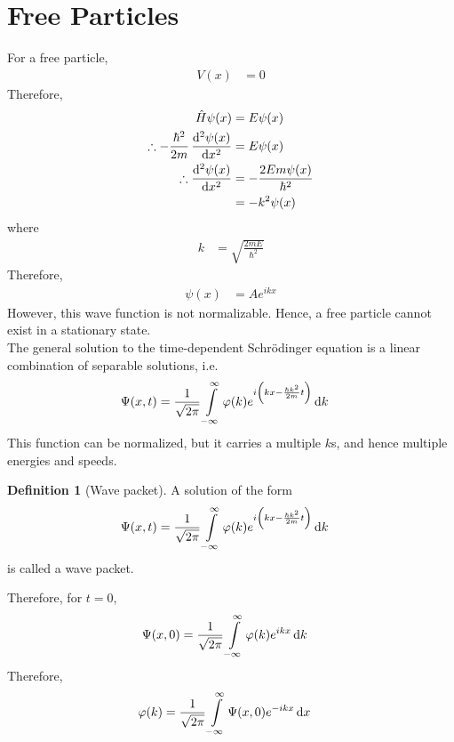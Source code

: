 \documentclass[titlepage, fleqn, a4paper, 12pt, twoside]{article}
\theoremstyle{definition}
\newtheorem{definition}{Definition}
\theoremstyle{theorem}
\let\Oldsection\section
\renewcommand{\section}{\FloatBarrier\Oldsection}
\begin{document}

\section{Free Particles}

For a free particle,
\begin{align*}
	V(x) &= 0
\end{align*}
Therefore,
\begin{align*}
	\hat{H} \psi(x) &= E \psi(x)\\
	\therefore -\frac{\hbar^2}{2 m} \dod[2]{\psi(x)}{x} &= E \psi(x)\\
	\therefore \dod[2]{\psi(x)}{x} &= -\frac{2 E m \psi(x)}{\hbar^2}\\
	&= -k^2 \psi(x)
\end{align*}
where
\begin{align*}
	k &= \sqrt{\frac{2 m E}{\hbar^2}}
\end{align*}
Therefore,
\begin{align*}
	\psi(x) &= A e^{i k x}
\end{align*}
However, this wave function is not normalizable.
Hence, a free particle cannot exist in a stationary state.\\

The general solution to the time-dependent Schrödinger equation is a linear combination of separable solutions, i.e.
\begin{align*}
	\Psi(x,t) &= \frac{1}{\sqrt{2 \pi}} \int\limits_{-\infty}^{\infty} \varphi(k) e^{i \left( k x - \frac{\hbar k^2}{2 m} t \right)} \dif k
\end{align*}
This function can be normalized, but it carries a multiple $k$s, and hence multiple energies and speeds.

\begin{definition}[Wave packet]
	A solution of the form
	\begin{align*}
		\Psi(x,t) &= \frac{1}{\sqrt{2 \pi}} \int\limits_{-\infty}^{\infty} \varphi(k) e^{i \left( k x - \frac{\hbar k^2}{2 m} t \right)} \dif k
	\end{align*}
	is called a wave packet.
\end{definition}

Therefore, for $t = 0$,
\begin{align*}
	\Psi(x,0) &= \frac{1}{\sqrt{2 \pi}} \int\limits_{-\infty}^{\infty} \varphi(k) e^{i k x} \dif k
\end{align*}
Therefore,
\begin{align*}
	\varphi(k) &= \frac{1}{\sqrt{2 \pi}} \int\limits_{-\infty}^{\infty} \Psi(x,0) e^{-i k x} \dif x
\end{align*}
\end{document}
